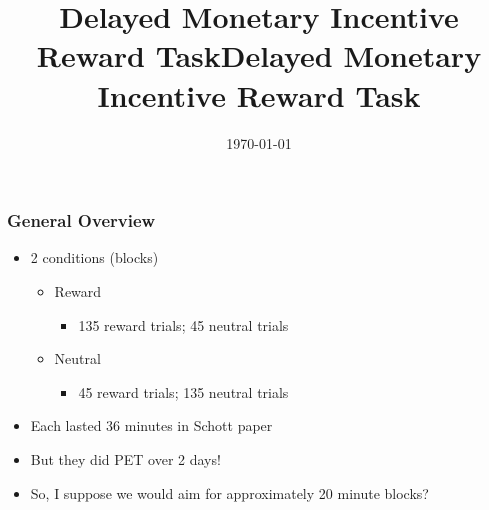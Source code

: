 \documentclass{beamer}
\title{Delayed Monetary Incentive Reward Task}
\date{\today}
\title[{\makebox[.953\paperwidth]{Delayed Monetary Incentive Reward Task\hfill%
\insertframenumber/\inserttotalframenumber}}]{Delayed Monetary Incentive Reward Task}
\begin{document}
\begin{frame}
\titlepage
\end{frame}

\begin{frame}
\frametitle{General Overview}
	\begin{itemize}
		\item 2 conditions (blocks)
			\begin{itemize}
				\item Reward
					\begin{itemize}
						\item 135 reward trials; 45 neutral trials
					\end{itemize}
				\item Neutral
					\begin{itemize}
						\item 45 reward trials; 135 neutral trials
					\end{itemize}
			\end{itemize}
		\item Each lasted 36 minutes in Schott paper
		\item But they did PET over 2 days!
		\item So, I suppose we would aim for approximately 20 minute blocks?
	\end{itemize}
\end{frame}
\end{document}
